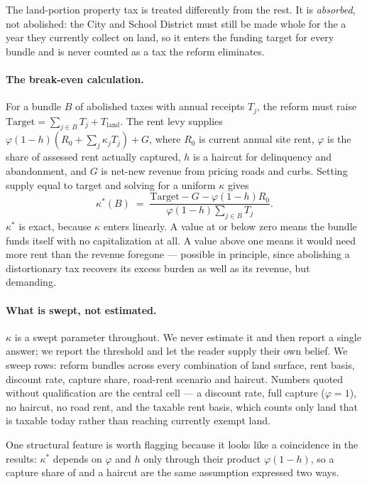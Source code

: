 \documentclass[11pt]{article}
\begin{document}
The land-portion property tax is treated differently from the rest. It is \emph{absorbed},
not abolished: the City and School District must still be made whole for the
\StxLandTaxB{} a year they currently collect on land, so it enters the funding target for
every bundle and is never counted as a tax the reform eliminates.

\paragraph{The break-even calculation.} For a bundle $B$ of abolished taxes with annual
receipts $T_j$, the reform must raise $\text{Target} = \sum_{j \in B} T_j + T_{\text{land}}$.
The rent levy supplies $\varphi(1-h)\left(R_0 + \sum_j \kappa_j T_j\right) + G$, where $R_0$ is
current annual site rent, $\varphi$ is the share of assessed rent actually captured, $h$ is a
haircut for delinquency and abandonment, and $G$ is net-new revenue from pricing roads and
curbs. Setting supply equal to target and solving for a uniform $\kappa$ gives
\[
  \kappa^*(B) \;=\; \frac{\text{Target} - G - \varphi(1-h)R_0}{\varphi(1-h)\sum_{j \in B} T_j}.
\]
$\kappa^*$ is exact, because $\kappa$ enters linearly. A value at or below zero means the
bundle funds itself with no capitalization at all. A value above one means it would need more
rent than the revenue foregone --- possible in principle, since abolishing a distortionary tax
recovers its excess burden as well as its revenue, but demanding.

\paragraph{What is swept, not estimated.} $\kappa$ is a swept parameter throughout. We never
estimate it and then report a single answer; we report the threshold and let the reader supply
their own belief. We sweep \StxSweepRows{} rows: \StxBundleCount{} reform bundles across every
combination of land surface, rent basis, discount rate, capture share, road-rent scenario and
haircut. Numbers quoted without qualification are the central cell --- a \StxDiscountRate{}
discount rate, full capture ($\varphi = 1$), no haircut, no road rent, and the taxable rent
basis, which counts only land that is taxable today rather than reaching currently exempt
land.

One structural feature is worth flagging because it looks like a coincidence in the results:
$\kappa^*$ depends on $\varphi$ and $h$ only through their product $\varphi(1-h)$, so a
capture share of \StxPhiLow{} and a \StxHaircutHighPct{} haircut are the same assumption expressed two ways.
\end{document}
